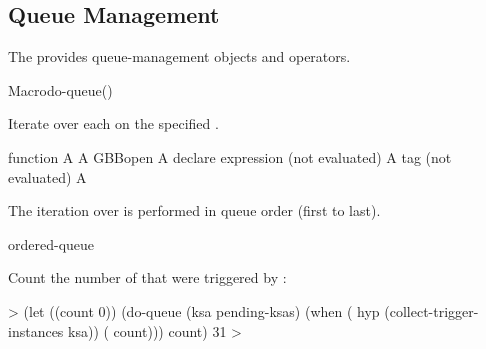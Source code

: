 \documentclass[10pt,twoside,english,pdftex]{article}
\begin{document}

\T\markright{}%
\T\pagestyle{plain}
\T\clearpage
\W{}
\T\pagestyle{fancy}
\T\thispagestyle{fancybottom}
\T\global\def\fnlastname{ }%
\subsection{Queue Management}
\label{sec:queue}%

%
%
%
The   provides queue-management objects and
operators.

\W\entities
\T\clearpage


\begin{functiondoc}{Macro}{do-queue}{()
    \superstar{} 
    }
%
%

\fnsyntax

\fnpurpose Iterate over each  on the
specified .

\fnpackage {}

\fnmodule {}

\fnargs
\begin{args}{function}
\arg[var] A 
\arg[queue] A GBBopen 
\arg[declaration] A declare expression (not evaluated)
\arg[tag] A  tag (not evaluated)
\arg[form] A 
\end{args}

\fndescription The iteration over  is performed
in queue order (first to last).

\begin{alsos}{ordered-queue}
\also[queue]
\end{alsos}

\fnexample
{}%
%
%
%
Count the number of  that were triggered by :
%
\W\supp
\begin{example}
  > (let ((count 0))
      (do-queue (ksa pending-ksas)
        (when ( hyp (collect-trigger-instances ksa))
          ( count)))
       count)
  31
  >
\end{example}

\end{functiondoc}
\end{document}
